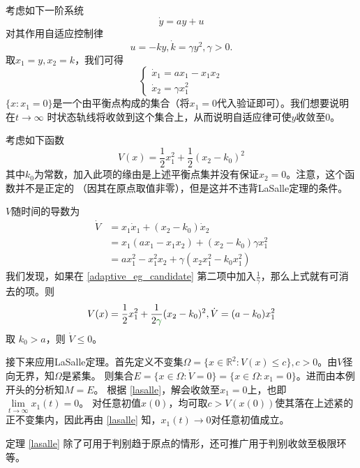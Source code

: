 \begin{example}[利用LaSalle定理判别自适应控制的收敛性]
	考虑如下一阶系统
  \[ \dot{y} = a  y + u \]
  对其作用自适应控制律
  \[ u = - k  y, \dot{k} = \gamma y^2, \gamma > 0. \]
  取$x_1 = y, x_2 = k$，我们可得
  \[ \left\{\begin{array}{l}
       \dot{x}_1 = a  x_1 - x_1 x_2\\
       \dot{x}_2 = \gamma x^2_1
     \end{array}\right. \]
  $\{x:x_1 = 0\}$是一个由平衡点构成的集合（将$x_1=0$代入验证即可）。我们想要说明在$t \rightarrow \infty$
  时状态轨线将收敛到这个集合上，从而说明自适应律可使$y$收敛至$0$。
  
  考虑如下函数
  \begin{equation}\label{adaptive_eg_candidate}
	V (x) = \frac{1}{2} x^2_1 + \frac{1}{2} (x_2 - k_0)^2
  \end{equation}
  其中$k_0$为常数，加入此项的缘由是上述平衡点集并没有保证$x_2=0$。注意，这个函数并不是正定的
  （因其在原点取值非零），但是这并不违背LaSalle定理的条件。
  
  $V$随时间的导数为
  \begin{align*}
    \dot{V} & =  x_1 \dot{x}_1 +  (x_2 - k_0) \dot{x}_2\\
    & =  x_1 (a  x_1 - x_1 x_2) + (x_2 - k_0) \gamma x^2_1\\
	&= ax_1^2-x_1^2x_2+\gamma(x_2x_1^2-k_0x_1^2)
  \end{align*}
  我们发现，如果在 \eqref{adaptive_eg_candidate} 第二项中加入$\frac{1}{\gamma}$，那么上式就有可消去的项。则
  \[V (x) = \frac{1}{2} x^2_1 + \frac{1}{2\textcolor{structurecolor}{\gamma}} (x_2 - k_0)^2, \dot{V}  =  (a - k_0)  x^2_1\]
  取 $k_0 > a$，则 $\dot{V} \leq 0$。

  接下来应用LaSalle定理。首先定义不变集$\Omega = \{ x \in \mathbb{R}^2 : V (x) \leq c \},c>0$。由$V$径向无界，知$\Omega$是紧集。
  则集合$E =\{ x \in \Omega :\dot{V}= 0 \}= \{ x \in \Omega : x_1 = 0 \}$。进而由本例开头的分析知$M = E$。
  根据 \ref{lasalle}，解会收敛至$x_1=0$上，也即$\lim\limits_{t \rightarrow \infty} x_1 (t) = 0$。
  对任意初值$x(0)$，均可取$c>V(x(0))$使其落在上述紧的正不变集内，因此再由 \ref{lasalle} 知，$x_1(t)\to0$对任意初值成立。
\end{example}
定理 \ref{lasalle} 除了可用于判别趋于原点的情形，还可推广用于判别收敛至极限环等。
